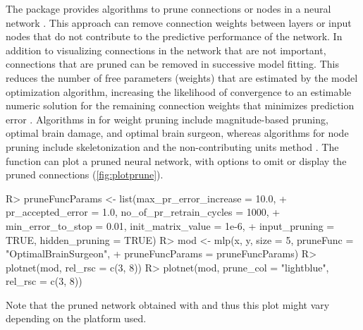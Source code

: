 \documentclass[article]{jss}
\begin{document}
The  package provides algorithms to prune connections or
nodes in a neural network \citep{Bergmeir12}.  This approach can
remove connection weights between layers or input nodes that do not
contribute to the predictive performance of the network.  In addition
to visualizing connections in the network that are not important,
connections that are pruned can be removed in successive model
fitting.  This reduces the number of free parameters (weights) that
are estimated by the model optimization algorithm, increasing the
likelihood of convergence to an estimable numeric solution for the
remaining connection weights that minimizes prediction error
\citep[i.e., model identifiability;][]{Ellenius00}. Algorithms in
 for weight pruning include magnitude-based pruning,
optimal brain damage, and optimal brain surgeon, whereas algorithms
for node pruning include skeletonization and the non-contributing
units method \citep{Zell98}.  The  function can plot a
pruned neural network, with options to omit or display the pruned
connections (\cref{fig:plotprune}).
%
\begin{Schunk}
\begin{Sinput}
R> pruneFuncParams <- list(max_pr_error_increase = 10.0,
+    pr_accepted_error = 1.0, no_of_pr_retrain_cycles = 1000, 
+    min_error_to_stop = 0.01, init_matrix_value = 1e-6,  
+    input_pruning = TRUE, hidden_pruning = TRUE)
R> mod <- mlp(x, y, size = 5, pruneFunc = "OptimalBrainSurgeon",
+    pruneFuncParams = pruneFuncParams)
R> plotnet(mod, rel_rsc = c(3, 8))
R> plotnet(mod, prune_col = "lightblue", rel_rsc = c(3, 8))
\end{Sinput}
\end{Schunk}
%
Note that the pruned network obtained with  and thus this
plot might vary depending on the platform used.
%
\end{document}
